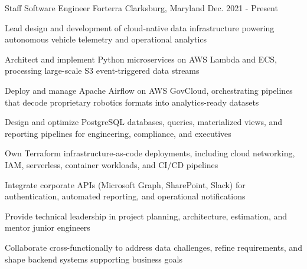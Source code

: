 

\begin{cventries}


\cventry
{Staff Software Engineer} %
{Forterra} %
{Clarksburg, Maryland} %
{Dec. 2021 - Present} %
{
  \begin{cvitems} %
    \item {Lead design and development of cloud-native data infrastructure powering autonomous vehicle telemetry and operational analytics}
    \item {Architect and implement Python microservices on AWS Lambda and ECS, processing large-scale S3 event-triggered data streams}
    \item {Deploy and manage Apache Airflow on AWS GovCloud, orchestrating pipelines that decode proprietary robotics formats into analytics-ready datasets}
    \item {Design and optimize PostgreSQL databases, queries, materialized views, and reporting pipelines for engineering, compliance, and executives}
    \item {Own Terraform infrastructure-as-code deployments, including cloud networking, IAM, serverless, container workloads, and CI/CD pipelines}
    \item {Integrate corporate APIs (Microsoft Graph, SharePoint, Slack) for authentication, automated reporting, and operational notifications}
    \item {Provide technical leadership in project planning, architecture, estimation, and mentor junior engineers}
    \item {Collaborate cross-functionally to address data challenges, refine requirements, and shape backend systems supporting business goals}
  \end{cvitems}
}



\end{cventries}
